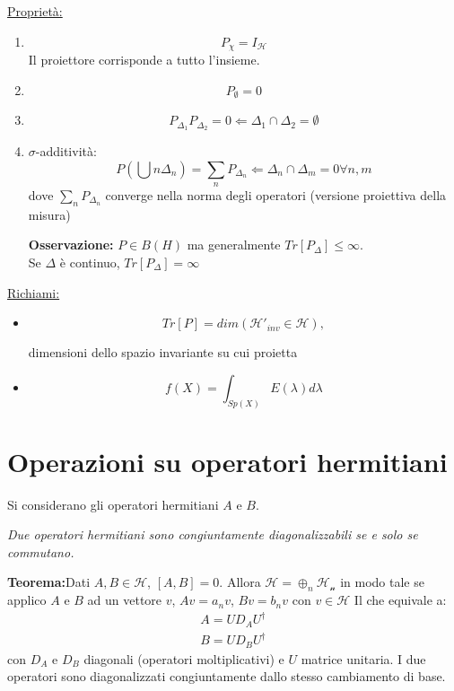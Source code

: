 \underline{Proprietà:}
\begin{enumerate}
\item \begin{equation*}
P_{\chi}= I_{\mathcal{H}}
\end{equation*}
Il proiettore corrisponde a tutto l'insieme.

\item \begin{equation*}
P_{\emptyset}=0
\end{equation*}

\item$$
P_{\Delta_{1}}P_{\Delta_{2}}=0 \Longleftarrow \Delta_{1}\cap\Delta_{2}=\emptyset
$$

\item$\sigma$-additività:
$$
P(\bigcup{n}\Delta_{n})=\sum_{n}P_{\Delta_{n}}\Longleftarrow \Delta_{n}\cap\Delta_{m}=0 \forall n,m
$$
dove $\sum_{n}P_{\Delta_{n}}$ converge nella norma degli operatori (versione proiettiva della misura)

\textbf{Osservazione:} $P\in\textit{B}(H)$ ma generalmente $Tr[P_{\Delta}]\leq\infty$.\\
Se $\Delta$ è continuo, $Tr[P_{\Delta}]=\infty$
\end{enumerate}

\underline{Richiami:}
\begin{itemize}
\item
$$
Tr[P]=dim(\mathcal{H'}_{inv}\in\mathcal{H}),
$$
\begin{center}
dimensioni dello spazio invariante su cui proietta
\end{center}
\item
$$
f(X)=\int_{Sp(X)}E(\lambda)d\lambda
$$
\end{itemize}


\section{Operazioni su operatori hermitiani} %
Si considerano gli operatori hermitiani $A$ e $B$.

\textit{Due operatori hermitiani sono congiuntamente diagonalizzabili se e solo se commutano.}

\textbf{Teorema:}Dati $A,B\in \mathcal{H}$, $\left[A,B\right]=0$. Allora $\mathcal{H}=\oplus_{n}\mathcal{H_{n}}$ in modo tale se applico $A$ e $B$ ad un vettore $v$, $Av=a_nv$, $Bv=b_nv$ con $v\in \mathcal{H}$
Il che equivale a:
\begin{equation*}\begin{split}
A=UD_AU^{\dagger} \\
B=UD_BU^{\dagger}
\end{split}\end{equation*}
con $D_A$ e $D_B$ diagonali (operatori moltiplicativi) e $U$ matrice unitaria.
I due operatori sono diagonalizzati congiuntamente dallo stesso cambiamento di base.

